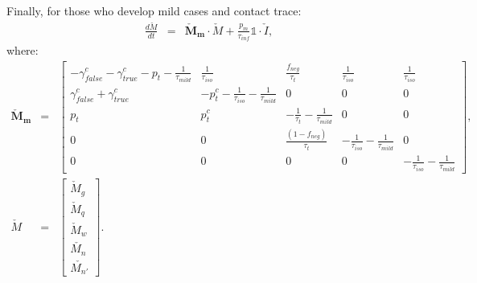 \documentclass[notitlepage, superscriptaddress]{revtex4-2}
\begin{document}
Finally, for those who develop mild cases and contact trace:
\begin{eqnarray}
\frac{d\check{M}}{dt} &=& \boldsymbol{\check{M}_{m}} \cdot \check{M} + \frac{p_{m}}{\tau_{inf}} \mathbb{1} \cdot  \check{I}, 
\end{eqnarray}
where:
%
\begin{eqnarray}
\boldsymbol{\check{M}_{m}} &=&
\begin{bmatrix}
 -\gamma^{c}_{false} -\gamma^{c}_{true} - p_{t} -\frac{1}{\tau_{mild}} & \frac{1}{\tau_{iso}}  & \frac{f_{neg}}{\tau_{t}} & \frac{1}{\tau_{iso}} & \frac{1}{\tau_{iso}} \\
\gamma^{c}_{false} + \gamma^{c}_{true}    &  -p^{c}_{t}  - \frac{1}{\tau_{iso}} - \frac{1}{\tau_{mild}}      &  0    & 0  & 0\\
p_{t}     &  p^{c}_{t}                  &  -\frac{1}{\tau_{t}}  - \frac{1}{\tau_{mild}}  & 0 & 0\\
0 & 0 & \frac{(1-f_{neg})}{\tau_{t}}  & -\frac{1}{\tau_{iso}}  -  \frac{1}{\tau_{mild}} & 0 \\ 
0 & 0 & 0 & 0 & -\frac{1}{\tau_{iso}}  -  \frac{1}{\tau_{mild}}
\end{bmatrix}, \\ 
%
\check{M} &=& 
\begin{bmatrix}
\check{M}_{g} \\ \check{M}_{q} \\ \check{M}_{w}\\ \check{M_{n}} \\ \check{M_{n'}}
\end{bmatrix}. \\ 
%
%
\end{eqnarray}



\end{document}
